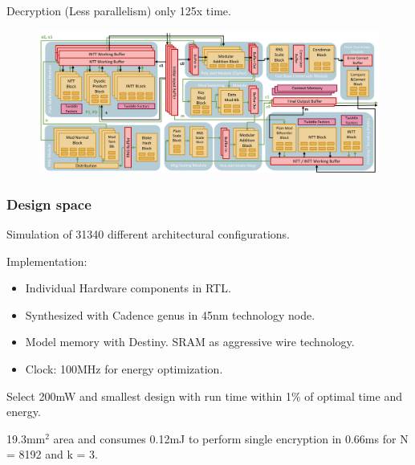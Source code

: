 \documentclass[10pt,handout]{beamer}
\begin{document}
\begin{frame}
{    \vspace{-0.2cm}
    Decryption (Less parallelism) only 125x time.
    \begin{figure}
        \includegraphics[width=1.0\textwidth]{architecture4.png}
    \end{figure}
}


\end{frame}




\begin{frame}
\frametitle{Design space}
Simulation of 31340 different architectural configurations.

Implementation:
\pause
\begin{itemize}
    \item Individual Hardware components in RTL.
    \item Synthesized with Cadence genus in 45nm technology node.
\pause
    \item Model memory with Destiny. SRAM as aggressive wire technology.
    \item Clock: 100MHz for energy optimization.
\end{itemize}


\pause
Select 200mW and smallest design with run time within 1\% of optimal time and energy.

19.3mm$^2$ area and consumes 0.12mJ to perform single encryption in 0.66ms for N = 8192 and k = 3.
\end{frame}
\end{document}
